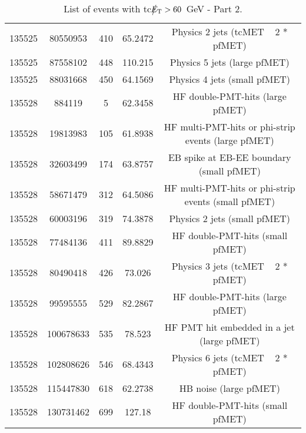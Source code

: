 \begin{table}[htbp]
\begin{center}
\begin{tabular}{|c|c|c|c|c|}
      135525  & 80550953     & 410  &    65.2472 & Physics 2 jets (tcMET ~ 2 * pfMET) \\
      135525  & 87558102     & 448  &    110.215 & Physics 5 jets (large pfMET) \\ 
      135525  & 88031668     & 450  &    64.1569 & Physics 4 jets (small pfMET) \\
      135528  & 884119       & 5    &    62.3458 & HF double-PMT-hits (large pfMET) \\
      135528  & 19813983     & 105  &    61.8938 & HF multi-PMT-hits or phi-strip events (large pfMET) \\
      135528  & 32603499     & 174  &    63.8757 & EB spike at EB-EE boundary (small pfMET) \\
      135528  & 58671479     & 312  &    64.5086 & HF multi-PMT-hits or phi-strip events (small pfMET) \\
      135528  & 60003196     & 319  &    74.3878 & Physics 2 jets (small pfMET) \\
      135528  & 77484136     & 411  &    89.8829 & HF double-PMT-hits (small pfMET) \\
      135528  & 80490418     & 426  &    73.026  & Physics 3 jets (tcMET ~ 2 * pfMET) \\
      135528  & 99595555     & 529  &    82.2867 & HF double-PMT-hits (large pfMET) \\
      135528  & 100678633    & 535  &    78.523  & HF PMT hit embedded in a jet (large pfMET) \\
      135528  & 102808626    & 546  &    68.4343 & Physics 6 jets (tcMET ~ 2 * pfMET) \\
      135528  & 115447830    & 618  &    62.2738 & HB noise (large pfMET) \\
      135528  & 130731462    & 699  &    127.18  & HF double-PMT-hits (small pfMET) \\
      \hline
    \end{tabular}
    \caption{List of events with tc$\big\slash\hspace{-1.6ex}{E_\text{T}}>60$~GeV - Part 2.}        
    \label{tab:tcMETlist2}
  \end{center}
\end{table}


